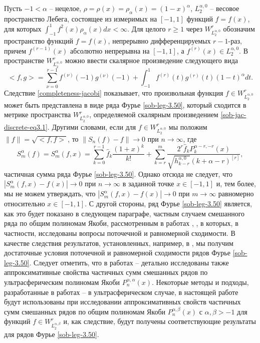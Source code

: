 Пусть $-1<\alpha$ -- нецелое, $\rho=\rho(x)=\rho_\alpha(x)=(1-x)^\alpha$,  $L_2^{\alpha,0}$ --  весовое пространство Лебега, состоящее
из измеримых на $[-1,1]$ функций $f=f(x)$, для которых $\int_{-1}^1f^2(x)\rho_\alpha(x)dx<\infty$. Для целого  $r\ge1$ через $W^r_{L_2^{\alpha,0}}$ обозначим пространство функций $f=f(x)$, непрерывно дифференцируемых $r-1$-раз, причем $f^{(r-1)}(x)$ абсолютно непрерывна на $[-1,1]$, а $f^{(r)}(x)\in L_2^{\alpha,0} $. В пространстве  $W^r_{L_2^{\alpha,0}}$ можно ввести скалярное произведение следующего вида
\begin{equation}\label{sob-jac-discrete-eq3.1}
<f,g>=\sum_{\nu=0}^{r-1}f^{(\nu)}(-1)g^{(\nu)}(-1)+\int_{-1}^{1} f^{(r)}(t)g^{(r)}(t)(1-t)^\alpha dt.
\end{equation}
Следствие \ref{completeness-jacobi} показывает, что произвольная  функция $f\in W^r_{L_2^{\alpha,0}}$ может быть представлена в виде ряда Фурье \eqref{sob-leg-3.50}, который сходится в метрике пространства $W^r_{L_2^{\alpha,0}}$, определяемой скалярным произведением \eqref{sob-jac-discrete-eq3.1}.
 Другими словами, если для $f\in W^r_{L_2^{\alpha,0}}$ мы положим $\|f\|=\sqrt{<f,f>}$, то $\|S_n(f)-f\|\to 0$ при $n\to\infty$, где
\begin{equation}\label{sob-jac-discrete-3.10}
S_m^\alpha(f)=S_m^\alpha(f,x)=
 \sum_{k=0}^{r-1}\hat f_k\frac{(1+x)^k}{k!}+ \sum_{k=r}^{m} \frac{2^r\hat f_kP_{k}^{\alpha-r,-r}(x)}{\sqrt{h_{k-r}^{\alpha,0}}(k+\alpha-r)^{[r]}},
     \end{equation}
 частичная сумма ряда Фурье \eqref{sob-leg-3.50}.  Однако отсюда не следует, что $|S_m^\alpha(f,x)-f(x)|\to 0$ при $n\to\infty$ в заданной точке $x\in[-1,1]$ и, тем более,  мы не можем утверждать, что $|S_m^\alpha(f,x)-f(x)|\to 0$ при $m\to\infty$ равномерно относительно  $x\in[-1,1]$. С другой стороны, ряд Фурье  \eqref{sob-leg-3.50} является, как  это будет показано в следующем параграфе, частным случаем смешанного ряда по общим полиномам Якоби, рассмотренным в работах \cite{sob-jac-discrete-Shar13},   \cite{sob-jac-discrete-Shar18},  в которых, в частности, исследованы  вопросы поточечной и равномерной сходимости. В качестве следствия результатов, установленных, например,  в \cite{sob-jac-discrete-Shar18}, мы получим достаточные условия поточечной и равномерной сходимости рядов Фурье \eqref{sob-leg-3.50}. Следует отметить, что в работах \cite{sob-jac-discrete-Shar11} -- \cite{sob-jac-discrete-Shar17} детально исследованы также аппроксимативные свойства  частичных сумм смешанных рядов по ультрасферическим полиномам Якоби $P_n^{\alpha,\alpha}(x)$. Некоторые  методы и подходы, разработанные в работах  \cite{sob-jac-discrete-Shar11} -- \cite{sob-jac-discrete-Shar17} в ультрасферическом случае, в настоящей работе будут использованы при исследовании аппроксимативных свойств частичных сумм смешанных рядов по общим полиномам Якоби  $P_n^{\alpha,\beta}(x)$ с $\alpha,\beta>-1$  для функций $f\in W^r_{L_2^{\alpha,\beta}}$  и, как следствие, будут получены соответствующие результаты для рядов Фурье  \eqref{sob-leg-3.50}.
